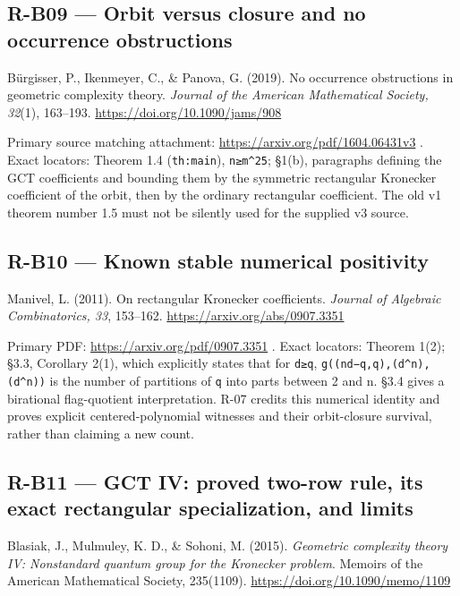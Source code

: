 \documentclass[11pt,a4paper]{article}
\theoremstyle{definition}\newtheorem{definition}{Definition}
\begin{document}
\subsection{R-B09 --- Orbit versus closure and no occurrence
obstructions}\label{r-b09--orbit-versus-closure-and-no-occurrence-obstructions}

Bürgisser, P., Ikenmeyer, C., \& Panova, G. (2019). No occurrence
obstructions in geometric complexity theory. \emph{Journal of the
American Mathematical Society, 32}(1), 163--193.
\url{https://doi.org/10.1090/jams/908}

Primary source matching attachment:
\url{https://arxiv.org/pdf/1604.06431v3} . Exact locators: Theorem 1.4
(\nolinkurl{th:main}), \texttt{n≥m\^{}25}; §1(b), paragraphs defining the
GCT coefficients and bounding them by the symmetric rectangular
Kronecker coefficient of the orbit, then by the ordinary rectangular
coefficient. The old v1 theorem number 1.5 must not be silently used for
the supplied v3 source.

\subsection{R-B10 --- Known stable numerical
positivity}\label{r-b10--known-stable-numerical-positivity}

Manivel, L. (2011). On rectangular Kronecker coefficients. \emph{Journal
of Algebraic Combinatorics, 33}, 153--162.
\url{https://arxiv.org/abs/0907.3351}

Primary PDF: \url{https://arxiv.org/pdf/0907.3351} . Exact locators:
Theorem 1(2); §3.3, Corollary 2(1), which explicitly states that for
\nolinkurl{d≥q}, \texttt{g((nd−q,q),(d\^{}n),(d\^{}n))} is the number of
partitions of \nolinkurl{q} into parts between 2 and n. §3.4 gives a
birational flag-quotient interpretation. R-07 credits this numerical
identity and proves explicit centered-polynomial witnesses and their
orbit-closure survival, rather than claiming a new count.

\subsection{R-B11 --- GCT IV: proved two-row rule, its exact rectangular
specialization, and
limits}\label{r-b11--gct-iv-proved-two-row-rule-its-exact-rectangular-specialization-and-limits}

Blasiak, J., Mulmuley, K. D., \& Sohoni, M. (2015). \emph{Geometric
complexity theory IV: Nonstandard quantum group for the Kronecker
problem}. Memoirs of the American Mathematical Society, 235(1109).
\url{https://doi.org/10.1090/memo/1109}
\end{document}
